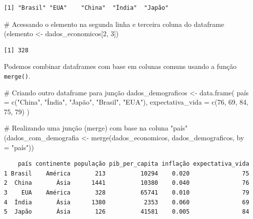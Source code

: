 \documentclass[
  portuguese,
  letterpaper,
  DIV=11,
  numbers=noendperiod]{scrreprt}
\newenvironment{Shaded}{\begin{snugshade}}{\end{snugshade}}
\newcommand{\AttributeTok}[1]{\textcolor[rgb]{0.40,0.45,0.13}{#1}}
\newcommand{\CommentTok}[1]{\textcolor[rgb]{0.37,0.37,0.37}{#1}}
\newcommand{\DecValTok}[1]{\textcolor[rgb]{0.68,0.00,0.00}{#1}}
\newcommand{\FunctionTok}[1]{\textcolor[rgb]{0.28,0.35,0.67}{#1}}
\newcommand{\NormalTok}[1]{\textcolor[rgb]{0.00,0.23,0.31}{#1}}
\newcommand{\OtherTok}[1]{\textcolor[rgb]{0.00,0.23,0.31}{#1}}
\newcommand{\StringTok}[1]{\textcolor[rgb]{0.13,0.47,0.30}{#1}}
\theoremstyle{definition}
\theoremstyle{remark}
\begin{document}
\begin{verbatim}
[1] "Brasil" "EUA"    "China"  "Índia"  "Japão" 
\end{verbatim}

\begin{Shaded}
\begin{Highlighting}[]
\CommentTok{\# Acessando o elemento na segunda linha e terceira coluna do dataframe}
\NormalTok{(elemento }\OtherTok{\textless{}{-}}\NormalTok{ dados\_economicos[}\DecValTok{2}\NormalTok{, }\DecValTok{3}\NormalTok{])}
\end{Highlighting}
\end{Shaded}

\begin{verbatim}
[1] 328
\end{verbatim}

Podemos combinar dataframes com base em colunas comuns usando a função
\texttt{merge()}.

\begin{Shaded}
\begin{Highlighting}[]
\CommentTok{\# Criando outro dataframe para junção}
\NormalTok{dados\_demograficos }\OtherTok{\textless{}{-}} \FunctionTok{data.frame}\NormalTok{(}
\NormalTok{  país }\OtherTok{=} \FunctionTok{c}\NormalTok{(}\StringTok{"China"}\NormalTok{, }\StringTok{"Índia"}\NormalTok{, }\StringTok{"Japão"}\NormalTok{, }\StringTok{"Brasil"}\NormalTok{, }\StringTok{"EUA"}\NormalTok{),}
  \AttributeTok{expectativa\_vida =} \FunctionTok{c}\NormalTok{(}\DecValTok{76}\NormalTok{, }\DecValTok{69}\NormalTok{, }\DecValTok{84}\NormalTok{, }\DecValTok{75}\NormalTok{, }\DecValTok{79}\NormalTok{)}
\NormalTok{)}

\CommentTok{\# Realizando uma junção (merge) com base na coluna "país"}
\NormalTok{(dados\_com\_demografia }\OtherTok{\textless{}{-}} \FunctionTok{merge}\NormalTok{(dados\_economicos, dados\_demograficos, }\AttributeTok{by =} \StringTok{"país"}\NormalTok{))}
\end{Highlighting}
\end{Shaded}

\begin{verbatim}
    país continente população pib_per_capita inflação expectativa_vida
1 Brasil    América       213          10294    0.020               75
2  China       Ásia      1441          10380    0.040               76
3    EUA    América       328          65741    0.010               79
4  Índia       Ásia      1380           2353    0.060               69
5  Japão       Ásia       126          41581    0.005               84
\end{verbatim}
\end{document}

